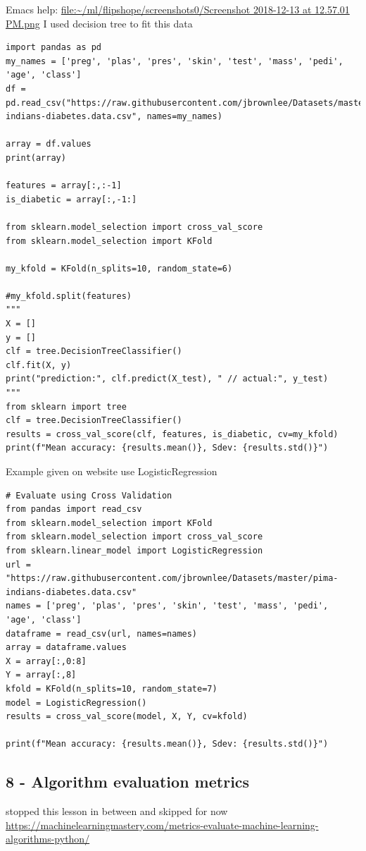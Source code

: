 \documentclass[11pt]{article}
\begin{document}
Emacs help: \href{screenshots0/Screenshot\%202018-12-13\%20at\%2012.57.01\%20PM.png}{file:\textasciitilde{}/ml/flipshope/screenshots0/Screenshot 2018-12-13 at 12.57.01 PM.png}
I used decision tree to fit this data
\begin{verbatim}
import pandas as pd
my_names = ['preg', 'plas', 'pres', 'skin', 'test', 'mass', 'pedi', 'age', 'class']
df = pd.read_csv("https://raw.githubusercontent.com/jbrownlee/Datasets/master/pima-indians-diabetes.data.csv", names=my_names)

array = df.values
print(array)

features = array[:,:-1]
is_diabetic = array[:,-1:]

from sklearn.model_selection import cross_val_score
from sklearn.model_selection import KFold

my_kfold = KFold(n_splits=10, random_state=6)

#my_kfold.split(features)
"""
X = []
y = []
clf = tree.DecisionTreeClassifier()
clf.fit(X, y)
print("prediction:", clf.predict(X_test), " // actual:", y_test)
"""
from sklearn import tree
clf = tree.DecisionTreeClassifier()
results = cross_val_score(clf, features, is_diabetic, cv=my_kfold)
print(f"Mean accuracy: {results.mean()}, Sdev: {results.std()}")
\end{verbatim}
Example given on website use LogisticRegression
\begin{verbatim}
# Evaluate using Cross Validation
from pandas import read_csv
from sklearn.model_selection import KFold
from sklearn.model_selection import cross_val_score
from sklearn.linear_model import LogisticRegression
url = "https://raw.githubusercontent.com/jbrownlee/Datasets/master/pima-indians-diabetes.data.csv"
names = ['preg', 'plas', 'pres', 'skin', 'test', 'mass', 'pedi', 'age', 'class']
dataframe = read_csv(url, names=names)
array = dataframe.values
X = array[:,0:8]
Y = array[:,8]
kfold = KFold(n_splits=10, random_state=7)
model = LogisticRegression()
results = cross_val_score(model, X, Y, cv=kfold)

print(f"Mean accuracy: {results.mean()}, Sdev: {results.std()}")

\end{verbatim}

\subsection{8 - Algorithm evaluation metrics}
\label{sec:orgef95110}
stopped this lesson in between and skipped for now
\url{https://machinelearningmastery.com/metrics-evaluate-machine-learning-algorithms-python/}
\end{document}
